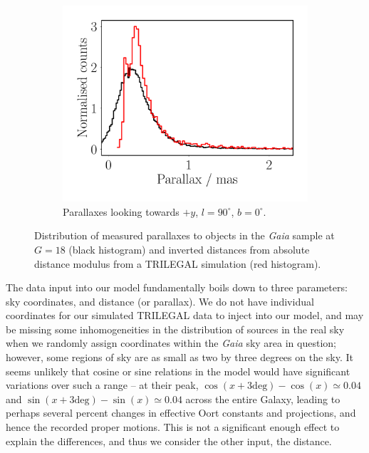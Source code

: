 \documentclass[fleqn,usenatbib]{mnras}
\begin{document}
\begin{figure}
\begin{subfigure}[b]{0.3\textwidth}
        \label{fig:l180dist}
    \end{subfigure}
    \begin{subfigure}[b]{0.3\textwidth}
        \centering
        \includegraphics[width=\textwidth]{Plots/plot_dist_gaia_90_0_18.pdf}
        \caption{Parallaxes looking towards $+y$, $l = 90^\circ$, $b = 0^\circ$.}
        \label{fig:l90dist}
    \end{subfigure}
    \caption{Distribution of measured parallaxes to objects in the \textit{Gaia} sample at $G = 18$ (black histogram) and inverted distances from absolute distance modulus from a TRILEGAL simulation (red histogram).}
    \label{fig:goodishdists}
\end{figure}

The data input into our model fundamentally boils down to three parameters: sky coordinates, and distance (or parallax).
We do not have individual coordinates for our simulated TRILEGAL data to inject into our model, and may be missing some inhomogeneities in the distribution of sources in the real sky when we randomly assign coordinates within the \textit{Gaia} sky area in question; however, some regions of sky are as small as two by three degrees on the sky.
It seems unlikely that cosine or sine relations in the model would have significant variations over such a range -- at their peak, $\cos(x + 3 \mathrm{deg}) - \cos(x) \simeq 0.04$ and $\sin(x + 3 \mathrm{deg}) - \sin(x) \simeq 0.04$ across the entire Galaxy, leading to perhaps several percent changes in effective Oort constants and projections, and hence the recorded proper motions.
This is not a significant enough effect to explain the differences, and thus we consider the other input, the distance.
\end{document}
